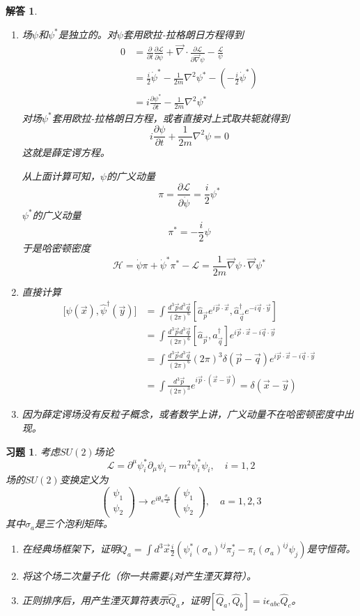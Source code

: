 \documentclass[a4paper,11pt]{ctexart}
\newtheorem{ex}{习题}[section]
\newtheorem{ans}{解答}[section]
\newcommand{\beq}{\begin{equation}}
\newcommand{\eeq}{\end{equation}}
\newcommand{\bea}{\begin{equation}\begin{aligned}}
\newcommand{\eea}{\end{aligned}\end{equation}}
\newcommand{\lag}{\mathcal{L}}
\newcommand{\del}{\vec{\nabla}}
\newcommand{\pfrac}[2]{\frac{\partial #1}{\partial #2}}
\newcommand{\mat}[1]{\begin{pmatrix} #1 \end{pmatrix}}
\newcommand{\pvol}[1]{\frac{d^3 \vec #1}{(2\pi)^3}}
\begin{document}
\begin{ans} 
\begin{enumerate} 
\item 场$\psi$和$\psi^*$是独立的。对$\psi$套用欧拉-拉格朗日方程得到
\bea
0 &= \pfrac{}{t}\pfrac{\lag}{\dot{\psi}} + \del \cdot \pfrac{\lag}{\del \psi} - \frac{\lag}{\psi} \\
&= \frac{i}{2} \dot{\psi}^* - \frac{1}{2m} \nabla^2 \psi^* - \left(- \frac{i}{2} \dot{\psi}^*\right) \\
&= i \pfrac{\psi^*}{t} - \frac{1}{2m} \nabla^2 \psi^*
\eea
对场$\psi^*$套用欧拉-拉格朗日方程，或者直接对上式取共轭就得到
\beq
i\pfrac{\psi}{t} + \frac{1}{2m} \nabla^2 \psi = 0
\eeq
这就是薛定谔方程。
\par
从上面计算可知，$\psi$的广义动量
\beq
\pi = \pfrac{\lag}{\dot{\psi}} = \frac{i}{2} \psi^*
\eeq
$\psi^*$的广义动量
\beq
\pi^* = - \frac{i}{2} \psi
\eeq
于是哈密顿密度
\beq
\mathcal{H} = \dot{\psi} \pi + \dot{\psi}^* \pi^* - \lag = \frac{1}{2m} \del \psi \cdot \del \psi^*
\eeq

\item 
直接计算
\bea
\lbrack \hat{\psi}(\vec x),\hat{\psi}^\dagger (\vec y) \rbrack &= \int \frac{d^3 \vec p d^3 \vec q}{(2\pi)^6} [\hat{a}_{\vec p} e^{i\vec p \cdot \vec x},\hat{a}^\dagger_{\vec q} e^{-i\vec q \cdot \vec y}] \\
&= \int \frac{d^3 \vec p d^3 \vec q}{(2\pi)^6} [\hat{a}_{\vec p} ,\hat{a}^\dagger_{\vec q} ]e^{i\vec p \cdot \vec x-i\vec q \cdot \vec y} \\
&=  \int \frac{d^3 \vec p d^3 \vec q}{(2\pi)^6} (2\pi)^3 \delta(\vec p - \vec q) e^{i\vec p \cdot \vec x-i\vec q \cdot \vec y} \\
&= \int \pvol{p}  e^{i\vec p \cdot (\vec x- \vec y)}  = \delta(\vec x - \vec y)
\eea

\item 因为薛定谔场没有反粒子概念，或者数学上讲，广义动量不在哈密顿密度中出现。

\end{enumerate}
\end{ans}


\begin{ex}
考虑$SU(2)$场论
\beq
\lag = \partial^\mu \psi^*_i \partial_\mu \psi_i - m^2 \psi^*_i \psi_i,\quad i=1,2
\eeq
场的$SU(2)$变换定义为
\beq
\mat{\psi_1 \\ \psi_2} \to e^{i \theta_a \frac{\sigma_a}{2}}\mat{\psi_1 \\ \psi_2} ,\quad a = 1,2,3
\eeq
其中$\sigma_a$是三个泡利矩阵。
\begin{enumerate}
\item 在经典场框架下，证明$Q_a = \int d^3 \vec x \frac{i}{2} \left( \psi^*_i (\sigma_a)^{ij} \pi^*_j - \pi_i (\sigma_a)^{ij} \psi_j \right)$是守恒荷。
\item 将这个场二次量子化（你一共需要4对产生湮灭算符）。
\item 正则排序后，用产生湮灭算符表示$\hat Q_a$，证明$[\hat Q_a,\hat Q_b] = i\epsilon_{abc} \hat Q_c$。
\end{enumerate}
\end{ex}
\end{document}
